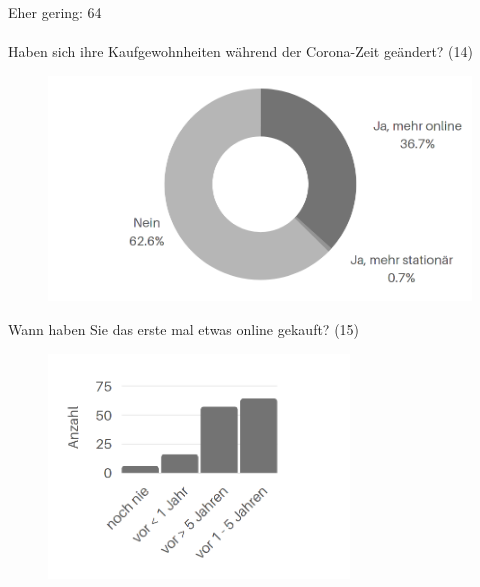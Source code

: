 Eher gering: 64\\\\
\fi
\newpage\noindent Haben sich ihre Kaufgewohnheiten während der Corona-Zeit geändert? (14)\vfill

\begin{figure}[H]
    \begin{center}
        \includegraphics[width=12cm]{media/schuelerumfrage/14.png}
    \end{center}
\end{figure}

\vfill\vfill
\noindent Wann haben Sie das erste mal etwas online gekauft? (15)\vfill

\begin{figure}[H]
    \begin{center}
        \includegraphics[width=8cm]{media/schuelerumfrage/15.png}
    \end{center}
\end{figure} 
\vfill

